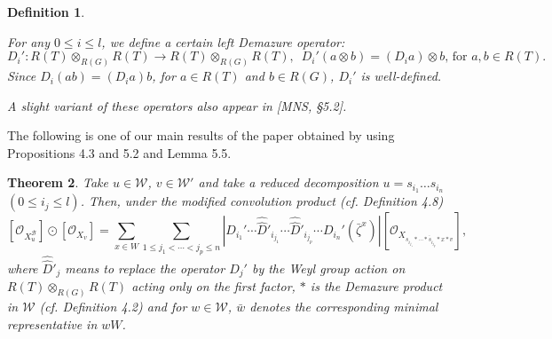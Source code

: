 \documentclass{article}
\newtheorem{theorem}{Theorem}[section]
\newtheorem{definition}[theorem]{Definition}
\def\B{\mathcal{B}}
\def\W{\mathcal{W}}
\def\ref#1{#1}
\begin{document}
\begin{definition}\label{def5.8}\rm{
For any $0\leq i \leq l$, we define a certain {\it left Demazure operator: }
$$
D_i' : R(T) \otimes_{R(G)} R(T) \rightarrow R(T)\otimes_{R(G)} R(T),
\,\,\,
D_i'\left( a\otimes b\right)=\left(D_i a\right)\otimes b, \,\text{for $a,b\in R(T)$}. 
$$
Since
$D_i\left(ab\right)=\left(D_i a\right)b$, for $a\in R(T)$ and $b\in R(G)$, 
$D_i'$ is well-defined. 

A slight variant of these operators also appear in [MNS, \S 5.2]. }
\end{definition}

The following is one of our main results of the paper obtained by using Propositions \ref{4.3} and \ref{5.2} and Lemma \ref{5.5}. 
\begin{theorem} \label{5.9}
Take $u\in \W$, $v\in \W'$ and take a reduced decomposition $u=s_{i_1}\ldots s_{i_n}$\,  $\left(0\leq i_j\leq l\right)$. Then, under the modified convolution product (cf. Definition \ref{4.8})
$$
\left[ \mathcal{O}_{X^\B_u}\right] \odot \left[ \mathcal{O}_{X_v}\right] = \sum_{x\in W} \sum_{1\leq j_1< \cdots <j_p\leq n} \left\vert D_{i_1}' \cdots \hat{\hat{D}}'_{i_{j_1}}\cdots \hat{\hat{D}}'_{i_{j_p}} \cdots D_{i_n}'\left(\bar{\zeta}^x \right)\right\vert [ \mathcal{O}_{X_{\overline{s_{i_{j_1}}*\cdots *s_{i_{j_p}}*x*v}}}],
$$
where $\hat{\hat{D}}'_j$ means to replace the operator $D_j'$ by the Weyl
group action on $R(T) \otimes_{R(G)} R(T)$ acting only on the first factor, $*$ is the Demazure product in $\W$ (cf. Definition \ref{4.2}) and for $w\in \W$, $\bar{w}$ denotes the corresponding minimal representative in $wW$. 
\end{theorem}
\end{document}
